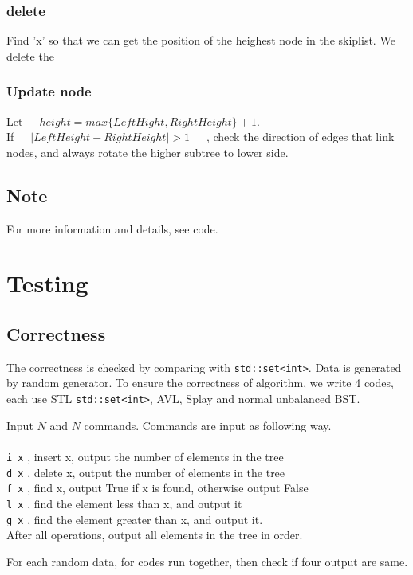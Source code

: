 \documentclass[UTF8]{report}
\numberwithin{figure}{subsection}
\numberwithin{table}{subsection}
\begin{document}
\subsection{delete}
Find 'x' so that we can get the position of the heighest node in the skiplist.
We delete the 

\subsection{Update node} Let\ \ \  $height=max\{LeftHight,RightHeight\}+1$.\\
If\ \ \  $|LeftHeight-RightHeight|>1$\ \ \ ,
check the direction of edges that link nodes, and always rotate the higher subtree to lower side.

\section*{Note} For more information and details, see code.



\chapter{Testing}
\section{Correctness}
The correctness is checked by comparing with \texttt{std::set<int>}. Data is generated by 
random generator.
To ensure the correctness of algorithm, we write 4 codes, each use STL \texttt{std::set<int>}, AVL, Splay 
and normal unbalanced BST.

Input $N$ and $N$ commands. Commands are input as following way.\\
\\\indent \texttt{i x} , insert x, output the number of elements in the tree\\
\indent \texttt{d x} , delete x, output the number of elements in the tree\\
\indent \texttt{f x} , find x, output True if x is found, otherwise output False\\
\indent \texttt{l x} , find the element less than x, and output it\\
\indent \texttt{g x} , find the element greater than x, and output it.\\
After all operations, output all elements in the tree in order.

For each random data, for codes run together, then check if four output are same.
\end{document}
